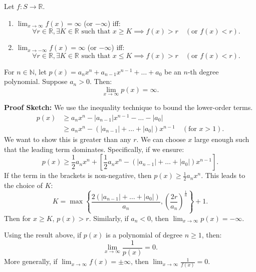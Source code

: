 \documentclass[
	UTF-8,
	11pt, %
	a4paper, %
]{LegrandOrangeBook}
\begin{document}
    \begin{definition}
    Let $f: S \to \mathbb{R}$.
    \begin{enumerate}
        \item $\lim_{x \to \infty} f(x) = \infty$ (or $-\infty$) iff:
        \[ \forall r \in \mathbb{R}, \exists K \in \mathbb{R} \text{ such that } x \ge K \implies f(x) > r \quad (\text{or } f(x) < r). \]
        
        \item $\lim_{x \to -\infty} f(x) = \infty$ (or $-\infty$) iff:
        \[ \forall r \in \mathbb{R}, \exists K \in \mathbb{R} \text{ such that } x \le K \implies f(x) > r \quad (\text{or } f(x) < r). \]
    \end{enumerate}
    \end{definition}

    \newpage

    \begin{example}
    For $n \in \mathbb{N}$, let $p(x) = a_n x^n + a_{n-1} x^{n-1} + \dots + a_0$ be an $n$-th degree polynomial. Suppose $a_n > 0$. Then:
    \[ \lim_{x \to \infty} p(x) = \infty. \]

    \noindent \textbf{Proof Sketch:}
    We use the inequality technique to bound the lower-order terms.
    \[
    \begin{aligned}
    p(x) &\ge a_n x^n - |a_{n-1}|x^{n-1} - \dots - |a_0| \\
    &\ge a_n x^n - (|a_{n-1}| + \dots + |a_0|) x^{n-1} \quad (\text{for } x > 1).
    \end{aligned}
    \]
    We want to show this is greater than any $r$.
    We can choose $x$ large enough such that the leading term dominates. Specifically, if we ensure:
    \[ p(x) \ge \frac{1}{2} a_n x^n + \left[ \frac{1}{2} a_n x^n - (|a_{n-1}| + \dots + |a_0|) x^{n-1} \right]. \]
    If the term in the brackets is non-negative, then $p(x) \ge \frac{1}{2} a_n x^n$.
    This leads to the choice of $K$:
    \[ K = \max \left\{ \frac{2(|a_{n-1}| + \dots + |a_0|)}{a_n}, \left( \frac{2r}{a_n} \right)^{\frac{1}{n}} \right\} + 1. \]
    Then for $x \ge K$, $p(x) > r$.
    Similarly, if $a_n < 0$, then $\lim_{x \to \infty} p(x) = -\infty$.
    \end{example}

    \begin{example}[Reciprocals]
    Using the result above, if $p(x)$ is a polynomial of degree $n \ge 1$, then:
    \[ \lim_{x \to \infty} \frac{1}{p(x)} = 0. \]
    More generally, if $\lim_{x \to \infty} f(x) = \pm \infty$, then $\lim_{x \to \infty} \frac{1}{f(x)} = 0$.
    \end{example}
\end{document}
